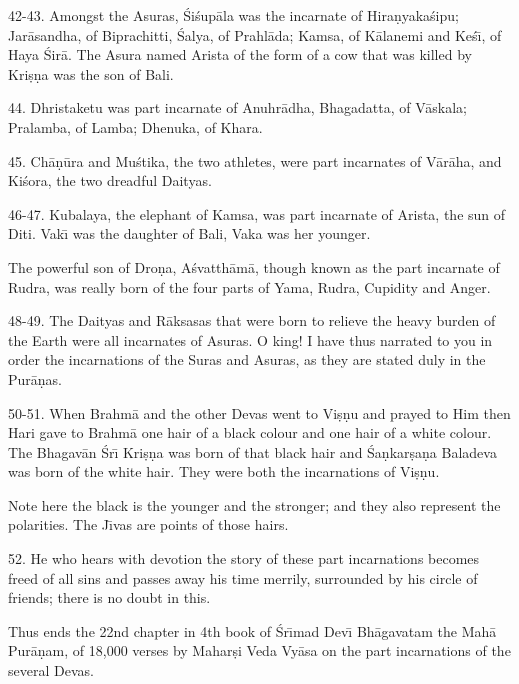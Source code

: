 42-43. Amongst the Asuras, \'Si\'sup\=ala was the incarnate of Hira\d{n}yaka\'sipu; Jar\=asandha, of Biprachitti, \'Salya, of Prahl\=ada; Kamsa, of K\=alanemi and Ke\'s\={\i}, of Haya \'Sir\=a. The Asura named Arista of the form of a cow that was killed by Kri\d{s}\d{n}a was the son of Bali.

44. Dhristaketu was part incarnate of Anuhr\=adha, Bhagadatta, of V\=askala; Pralamba, of Lamba; Dhenuka, of Khara.

45. Ch\=a\d{n}\=ura and Mu\'stika, the two athletes, were part incarnates of V\=ar\=aha, and Ki\'sora, the two dreadful Daityas.

46-47. Kubalaya, the elephant of Kamsa, was part incarnate of Arista, the sun of Diti. Vak\={\i} was the daughter of Bali, Vaka was her younger.

The powerful son of Dro\d{n}a, A\'svatth\=am\=a, though known as the part incarnate of Rudra, was really born of the four parts of Yama, Rudra, Cupidity and Anger.

48-49. The Daityas and R\=aksasas that were born to relieve the heavy burden of the Earth were all incarnates of Asuras. O king! I have thus narrated to you in order the incarnations of the Suras and Asuras, as they are stated duly in the Pur\=a\d{n}as.

50-51. When Brahm\=a and the other Devas went to Vi\d{s}\d{n}u and prayed to Him then Hari gave to Brahm\=a one hair of a black colour and one hair of a white colour. The Bhagav\=an \'Sr\={\i} Kri\d{s}\d{n}a was born of that black hair and \'Sa\d{n}kar\d{s}a\d{n}a Baladeva was born of the white hair. They were both the incarnations of Vi\d{s}\d{n}u.

Note here the black is the younger and the stronger; and they also represent the polarities. The J\={\i}vas are points of those hairs.

52. He who hears with devotion the story of these part incarnations becomes freed of all sins and passes away his time merrily, surrounded by his circle of friends; there is no doubt in this.

Thus ends the 22nd chapter in 4th book of \'Sr\={\i}mad Dev\={\i} Bh\=agavatam the Mah\=a Pur\=a\d{n}am, of 18,000 verses by Mahar\d{s}i Veda Vy\=asa on the part incarnations of the several Devas.



